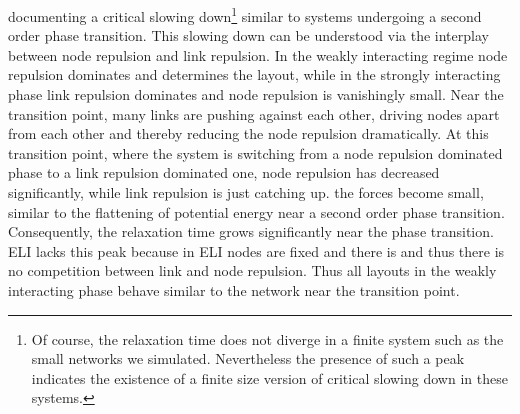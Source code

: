 \documentclass[nofootinbib,preprint,floatfix,titlepage,endfloats,superscriptaddress]{revtex4} %
\begin{document}
documenting a critical slowing down\footnote{Of course, the relaxation time does not diverge in a finite system such as the small networks we simulated. 
Nevertheless the presence of such a peak indicates the existence of a finite size version of critical slowing down in these systems.} similar to systems undergoing a second order phase transition. 
This slowing down can be understood via the interplay between node repulsion and link repulsion. 
In the weakly interacting regime node repulsion dominates and determines the layout, while in the strongly interacting phase link repulsion dominates and node repulsion is vanishingly small. 
Near the transition point, many links are pushing against each other, driving nodes apart from each other and thereby reducing the node repulsion dramatically. 
At this transition point, where the system is switching from a node repulsion dominated phase to a link repulsion dominated one, node repulsion has decreased significantly, while link repulsion is just catching up. the forces become small, similar to the flattening of potential energy near a second order phase transition.
Consequently, the relaxation time grows significantly near the phase transition. 
ELI lacks this peak %
because in ELI nodes are fixed and there is and thus there is no competition between link and node repulsion. 
Thus all layouts in the weakly interacting phase behave similar to the network near the transition point.  
\end{document}
